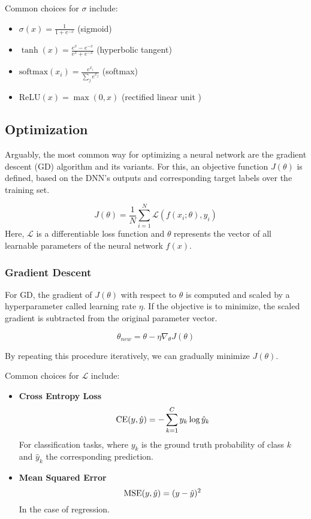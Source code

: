 Common choices for $\sigma$ include:

\begin{itemize}
    \item $\sigma(x) = \frac{1}{1 + e^{-x}}$ (sigmoid)
    \item $\tanh(x) = \frac{e^x - e^{-x}}{e^x + e^{-x}}$ (hyperbolic tangent)
    \item $\text{softmax}(x_i) = \frac{e^{x_i}}{\sum_j e^{x_j}}$ (softmax)
    \item $\text{ReLU}(x) = \max(0, x)$ (rectified linear unit \cite{nair2010rectified})
\end{itemize}

\subsection{Optimization}
Arguably, the most common way for optimizing a neural network are the gradient descent (GD) algorithm and its variants. For this, an objective function $J(\theta)$ is defined, based on the DNN's outputs and corresponding target labels over the training set.

\begin{equation}
    J(\theta) = \frac{1}{N} \sum_{i=1}^{N} \mathcal{L}(f(x_i; \theta), y_i)
\end{equation}
Here, $\mathcal{L}$ is a differentiable loss function and $\theta$ represents the vector of all learnable parameters of the neural network $f(x)$.

\subsubsection{Gradient Descent}
For GD, the gradient of $J(\theta)$ with respect to $\theta$ is computed and scaled by a hyperparameter called learning rate $\eta$. If the objective is to minimize, the scaled gradient is subtracted from the original parameter vector.

\begin{equation}
    \theta_{new} = \theta - \eta\nabla_\theta J(\theta)
\end{equation}

By repeating this procedure iteratively, we can gradually minimize $J(\theta)$.

Common choices for $\mathcal{L}$ include:
\begin{itemize}
    \item \textbf{Cross Entropy Loss}
          \begin{equation}
              \label{eq:ce_loss}
              \text{CE}(y, \hat{y}) = - \sum_{k=1}^C y_k \log \hat{y}_k
          \end{equation}
          For classification tasks, where $y_k$ is the ground truth probability of class $k$ and $\hat{y}_k$ the corresponding prediction.

    \item \textbf{Mean Squared Error}
          \begin{equation}
              \text{MSE}(y, \hat{y}) = (y - \hat{y})^2
          \end{equation}
          In the case of regression.
\end{itemize}

